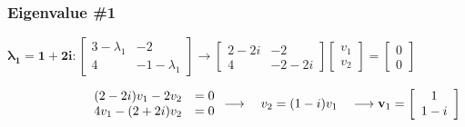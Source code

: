 \documentclass[12pt]{article}
\begin{document}
\begin{enumerate}
    \subsubsection*{Eigenvalue \#1}
    $\mathbf{\lambda_1 = 1+2i}: 
    \left[\begin{array}{cc} 3 - \lambda_1 & -2\\ 4 & -1 - \lambda_1\end{array}\right]
    \rightarrow \left[\begin{array}{cc} 2-2i& -2\\ 4 & -2-2i \end{array}\right] \left[\begin{array}{cc} v_1 \\ v_2 \end{array}\right] = \left[\begin{array}{cc} 0 \\ 0 \end{array}\right]$

    $\hspace*{2.2cm}\begin{array}{rr} (2-2i)v_1 - 2v_2 &=0 \\ 4v_1 - (2+2i)v_2 &=0 \end{array} 
     \longrightarrow \quad v_2=(1-i)v_1 \quad \longrightarrow \mathbf{v}_1 =\left[\begin{array}{cc} 1 \\ 1-i \end{array}\right]$


\end{enumerate}
\end{document}
